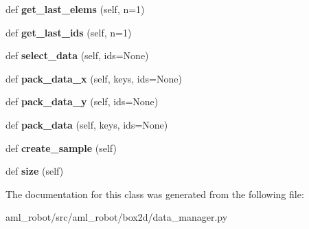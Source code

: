 \begin{DoxyCompactItemize}
def {\bfseries get\+\_\+last\+\_\+elems} (self, n=1)
\item 
\hypertarget{classaml__robot_1_1box2d_1_1data__manager_1_1_data_manager_a4f5a35574b483916068562d4d9f9c19c}{}\label{classaml__robot_1_1box2d_1_1data__manager_1_1_data_manager_a4f5a35574b483916068562d4d9f9c19c} 
def {\bfseries get\+\_\+last\+\_\+ids} (self, n=1)
\item 
\hypertarget{classaml__robot_1_1box2d_1_1data__manager_1_1_data_manager_aa573ee39665d43261bb768c1c3c1cb64}{}\label{classaml__robot_1_1box2d_1_1data__manager_1_1_data_manager_aa573ee39665d43261bb768c1c3c1cb64} 
def {\bfseries select\+\_\+data} (self, ids=None)
\item 
\hypertarget{classaml__robot_1_1box2d_1_1data__manager_1_1_data_manager_a3351b75171e381a07c89fabb723c770b}{}\label{classaml__robot_1_1box2d_1_1data__manager_1_1_data_manager_a3351b75171e381a07c89fabb723c770b} 
def {\bfseries pack\+\_\+data\+\_\+x} (self, keys, ids=None)
\item 
\hypertarget{classaml__robot_1_1box2d_1_1data__manager_1_1_data_manager_a73f284159c9b215bf6884565caf0f601}{}\label{classaml__robot_1_1box2d_1_1data__manager_1_1_data_manager_a73f284159c9b215bf6884565caf0f601} 
def {\bfseries pack\+\_\+data\+\_\+y} (self, ids=None)
\item 
\hypertarget{classaml__robot_1_1box2d_1_1data__manager_1_1_data_manager_ad9975a5ada92b83489e2ccd80db88f13}{}\label{classaml__robot_1_1box2d_1_1data__manager_1_1_data_manager_ad9975a5ada92b83489e2ccd80db88f13} 
def {\bfseries pack\+\_\+data} (self, keys, ids=None)
\item 
\hypertarget{classaml__robot_1_1box2d_1_1data__manager_1_1_data_manager_a4146de256982fba71b91a46a9117ae60}{}\label{classaml__robot_1_1box2d_1_1data__manager_1_1_data_manager_a4146de256982fba71b91a46a9117ae60} 
def {\bfseries create\+\_\+sample} (self)
\item 
\hypertarget{classaml__robot_1_1box2d_1_1data__manager_1_1_data_manager_aaa5cac201a4804c05c4ad9ee950aca33}{}\label{classaml__robot_1_1box2d_1_1data__manager_1_1_data_manager_aaa5cac201a4804c05c4ad9ee950aca33} 
def {\bfseries size} (self)
\end{DoxyCompactItemize}


The documentation for this class was generated from the following file\+:\begin{DoxyCompactItemize}
\item 
aml\+\_\+robot/src/aml\+\_\+robot/box2d/data\+\_\+manager.\+py\end{DoxyCompactItemize}
